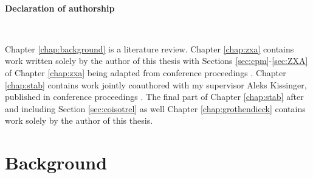 \documentclass[12pt]{ociamthesis}  %
\begin{document}
%
%
%
%

\

{\bf \large  Declaration of authorship}

\

Chapter \ref{chap:background} is a literature review.  Chapter \ref{chap:zxa} contains work written solely by the author of this thesis with Sections \ref{sec:cpm}-\ref{sec:ZXA} of Chapter \ref{chap:zxa} being adapted from conference proceedings \cite{zxa}.  Chapter \ref{chap:stab} contains work jointly coauthored with my supervisor Aleks Kissinger, published in conference proceedings \cite{lagrel}.  The final part of Chapter  \ref{chap:stab} after and including Section \ref{sec:coisotrel} as well Chapter \ref{chap:grothendieck} contains work solely by the author of this thesis.



\chapter{Background}
\end{document}
